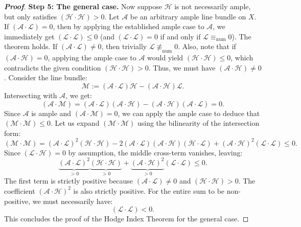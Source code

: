 \begin{proof}[\textbf{Proof}]
\textbf{Step 5: The general case.}
Now suppose $\mathcal{H}$ is not necessarily ample, but only satisfies $(\mathcal{H} \cdot \mathcal{H}) > 0$.
Let $\mathcal{A}$ be an arbitrary ample line bundle on $X$.
If $(\mathcal{A} \cdot \mathcal{L}) = 0$, then by applying the established ample case to $\mathcal{A}$, we immediately get $(\mathcal{L} \cdot \mathcal{L}) \leq 0$ (and $(\mathcal{L} \cdot \mathcal{L}) = 0$ if and only if $\mathcal{L} \equiv_{\text{num}} 0$). The theorem holds.
If $(\mathcal{A} \cdot \mathcal{L}) \neq 0$, then trivially $\mathcal{L} \not\equiv_{\text{num}} 0$.
Also, note that if $(\mathcal{A} \cdot \mathcal{H}) = 0$, applying the ample case to $\mathcal{A}$ would yield $(\mathcal{H} \cdot \mathcal{H}) \leq 0$, which contradicts the given condition $(\mathcal{H} \cdot \mathcal{H}) > 0$. Thus, we must have $(\mathcal{A} \cdot \mathcal{H}) \neq 0$.
Consider the line bundle:
\[
\mathcal{M} := (\mathcal{A} \cdot \mathcal{L})\mathcal{H} - (\mathcal{A} \cdot \mathcal{H})\mathcal{L}.
\]
Intersecting with $\mathcal{A}$, we get:
\[
(\mathcal{A} \cdot \mathcal{M}) = (\mathcal{A} \cdot \mathcal{L})(\mathcal{A} \cdot \mathcal{H}) - (\mathcal{A} \cdot \mathcal{H})(\mathcal{A} \cdot \mathcal{L}) = 0.
\]
Since $\mathcal{A}$ is ample and $(\mathcal{A} \cdot \mathcal{M}) = 0$, we can apply the ample case to deduce that $(\mathcal{M} \cdot \mathcal{M}) \leq 0$.
Let us expand $(\mathcal{M} \cdot \mathcal{M})$ using the bilinearity of the intersection form:
\[
(\mathcal{M} \cdot \mathcal{M}) = (\mathcal{A} \cdot \mathcal{L})^2 (\mathcal{H} \cdot \mathcal{H}) - 2(\mathcal{A} \cdot \mathcal{L})(\mathcal{A} \cdot \mathcal{H})(\mathcal{H} \cdot \mathcal{L}) + (\mathcal{A} \cdot \mathcal{H})^2 (\mathcal{L} \cdot \mathcal{L}) \leq 0.
\]
Since $(\mathcal{L} \cdot \mathcal{H}) = 0$ by assumption, the middle cross-term vanishes, leaving:
\[
\underbrace{(\mathcal{A} \cdot \mathcal{L})^2}_{> 0} \underbrace{(\mathcal{H} \cdot \mathcal{H})}_{> 0} + \underbrace{(\mathcal{A} \cdot \mathcal{H})^2}_{> 0} (\mathcal{L} \cdot \mathcal{L}) \leq 0.
\]
The first term is strictly positive because $(\mathcal{A} \cdot \mathcal{L}) \neq 0$ and $(\mathcal{H} \cdot \mathcal{H}) > 0$. The coefficient $(\mathcal{A} \cdot \mathcal{H})^2$ is also strictly positive. For the entire sum to be non-positive, we must necessarily have:
\[
(\mathcal{L} \cdot \mathcal{L}) < 0.
\]
This concludes the proof of the Hodge Index Theorem for the general case.

\end{proof}



